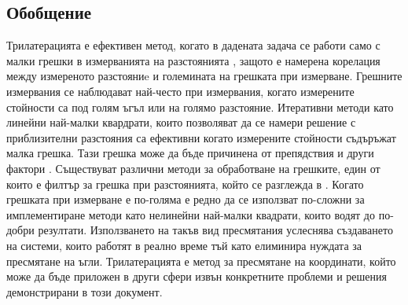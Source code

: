 \subsection{Обобщение}

Трилатерацията е ефективен метод, когато в дадената задача се работи само с малки грешки в измерванията на разстоянията \cite{trilat}, защото е намерена корелация между измереното разстояниe и големината на грешката при измерване. Грешните измервания се наблюдават най-често при измервания, когато измерените стойности са под голям ъгъл или на голямо разстояние. Итеративни методи като линейни най-малки квардрати, които позволяват да се намери решение с приблизителни разстояния са ефективни когато измерените стойности съдъръжат малка грешка. Тази грешка може да бъде причинена от препядствия и други фактори \cite{yonei}. Съществуват различни методи за обработване на грешките, един от които е филтър за грешка при разстоянията, който се разглежда в \cite{yonei}. Когато грешката при измерване е по-голяма е редно да се използват по-сложни за имплементиране методи като нелинейни най-малки квадрати, които водят до по-добри резултати. Използването на такъв вид пресмятания услеснява създаването на системи, които работят в реално време тъй като елиминира нуждата за пресмятане на ъгли. Трилатерацията е метод за пресмятане на координати, който може да бъде приложен в други сфери извън конкретните проблеми и решения демонстрирани в този документ. 